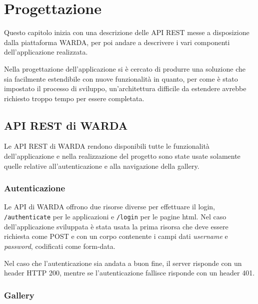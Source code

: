 
\chapter{Progettazione}
\label{cap:progettazione}


Questo capitolo inizia con una descrizione delle API REST messe a disposizione dalla piattaforma WARDA, per poi andare a descrivere i vari componenti dell'applicazione realizzata.

Nella progettazione dell'applicazione si è cercato di produrre una soluzione che sia facilmente estendibile con nuove funzionalità in quanto, per come è stato impostato il processo di sviluppo, un'architettura difficile da estendere avrebbe richiesto troppo tempo per essere completata.

\section{API REST di WARDA}

Le API REST di WARDA rendono disponibili tutte le funzionalità dell'applicazione e nella realizzazione del progetto sono state usate solamente quelle relative all'autenticazione e alla navigazione della gallery.

\subsection{Autenticazione}

Le API di WARDA offrono due risorse diverse per effettuare il login, \texttt{/authenticate} per le applicazioni e \texttt{/login} per le pagine html.
Nel caso dell'applicazione sviluppata è stata usata la prima risorsa che deve essere richiesta come POST e con un corpo contenente i campi dati \textit{username} e \textit{password}, codificati come form-data.

Nel caso che l'autenticazione sia andata a buon fine, il server risponde con un header HTTP 200, mentre se l'autenticazione fallisce risponde con un header 401.

\subsection{Gallery}

